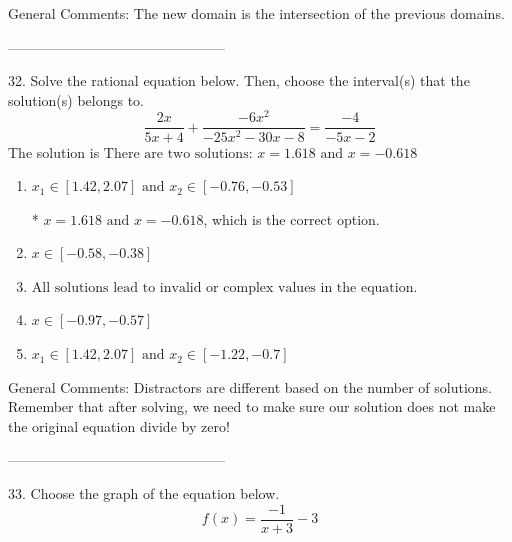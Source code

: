 \documentclass{extbook}[14pt]
\begin{document}
General Comments: The new domain is the intersection of the previous domains.

-----------------------------------------------

32. Solve the rational equation below. Then, choose the interval(s) that the solution(s) belongs to.
\[ \frac{2x}{5x + 4} + \frac{-6x^{2}}{-25x^{2} -30 x -8} = \frac{-4}{-5x -2} \] 
The solution is $ \text{There are two solutions: } x = 1.618 \text{ and } x = -0.618 $ 

\begin{enumerate}[label=\Alph*.] 
\item $ x_1 \in [1.42, 2.07] \text{ and } x_2 \in [-0.76,-0.53] $ 

 * $x = 1.618 \text{ and } x = -0.618$, which is the correct option. 
\item $ x \in [-0.58,-0.38] $ 

  
\item $ \text{All solutions lead to invalid or complex values in the equation.} $ 

  
\item $ x \in [-0.97,-0.57] $ 

  
\item $ x_1 \in [1.42, 2.07] \text{ and } x_2 \in [-1.22,-0.7] $ 

  
\end{enumerate} 
 
General Comments: Distractors are different based on the number of solutions. Remember that after solving, we need to make sure our solution does not make the original equation divide by zero!

-----------------------------------------------

33. Choose the graph of the equation below.
\[ f(x) = \frac{-1}{x + 3} - 3 \] 
\end{document}
